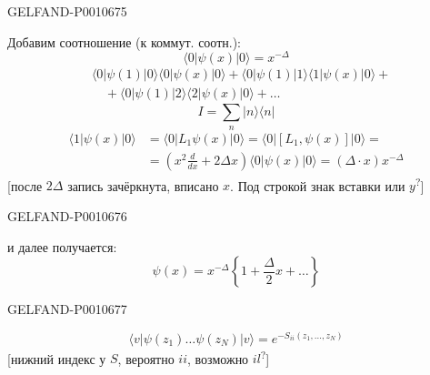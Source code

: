 \begin{GelfandAdjacentEvidence}{GELFAND-P001067}{5}


Добавим соотношение (к коммут. соотн.):
\begin{equation*}
\langle0|\psi(x)|0\rangle=x^{-\Delta}
\tag{26}
\end{equation*}
\begin{equation*}
\begin{aligned}
&\langle0|\psi(1)|0\rangle\langle0|\psi(x)|0\rangle+
\langle0|\psi(1)|1\rangle\langle1|\psi(x)|0\rangle+\\
&\quad+\langle0|\psi(1)|2\rangle\langle2|\psi(x)|0\rangle+\ldots
\end{aligned}
\tag{27}
\end{equation*}
\begin{equation*}
I=\sum_n|n\rangle\langle n|
\end{equation*}
\begin{equation*}
\begin{aligned}
\langle1|\psi(x)|0\rangle
&=\langle0|L_1\psi(x)|0\rangle
=\langle0|[L_1,\psi(x)]|0\rangle=\\
&=\left(x^2\frac{d}{dx}+2\Delta x\right)\langle0|\psi(x)|0\rangle
=(\Delta\cdot x)x^{-\Delta}
\end{aligned}
\end{equation*}
[после \(2\Delta\) запись зачёркнута, вписано \(x\). Под строкой знак вставки или \(y\)\textsuperscript{?}]
\end{GelfandAdjacentEvidence}
\begin{GelfandAdjacentEvidence}{GELFAND-P001067}{6}


и далее получается:
\begin{equation*}
\psi(x)=x^{-\Delta}\left\{1+\frac{\Delta}{2}x+\ldots\right\}
\end{equation*}
\end{GelfandAdjacentEvidence}
\begin{GelfandAdjacentEvidence}{GELFAND-P001067}{7}

\begin{equation*}
\langle v|\psi(z_1)\ldots\psi(z_N)|v\rangle=e^{-S_{ii}(z_1,\ldots,z_N)}
\end{equation*}
[нижний индекс у \(S\), вероятно \(ii\), возможно \(il\)\textsuperscript{?}]
\end{GelfandAdjacentEvidence}
